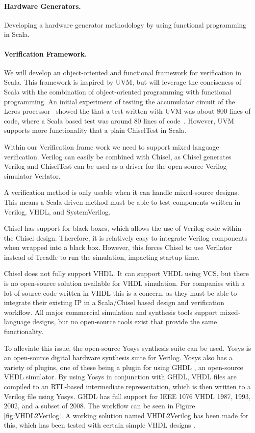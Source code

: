 \documentclass[fleqn,12pt]{article}
\begin{document}
\paragraph{Hardware Generators.}

Developing a hardware generator methodology by using functional programming in Scala.

\paragraph{Verification Framework.}

We will develop an object-oriented and functional framework for verification in Scala.
This framework is inspired by UVM, but will leverage the conciseness of Scala
with the combination of object-oriented programming with functional programming.
An initial experiment of testing the accumulator circuit of the Leros processor~\cite{leros:arcs2019}
showed the that a test written with UVM was about 800 lines of code, where a Scala based
test was around 80 lines of code~\cite{verify:chisel:2020}.
However, UVM supports more functionality that a plain ChiselTest in Scala.

Within our Verification frame work we need to support mixed language verification.
Verilog can easily be combined with Chisel, as Chisel generates Verilog and
ChiselTest can be used as a driver for the open-source Verilog simulator Verlator.

A verification method is only usable when it can handle mixed-source designs.
This means a Scala driven method must be able to test components written in Verilog,
VHDL, and SystemVerilog.

Chisel has support for black boxes, which allows the use of Verilog code within the Chisel design.
Therefore, it is relatively easy to integrate Verilog components when wrapped into a black box.
However, this forces Chisel to use Verilator instead of Treadle to run the simulation, impacting
startup time.

Chisel does not fully support VHDL. It can support VHDL using VCS, but there is no
open-source solution available for VHDL simulation. For companies with a lot of source code written in VHDL this is a concern, as they must be able to integrate their existing IP in a Scala/Chisel based design and verification workflow.
All major commercial simulation and synthesis tools support mixed-language designs, but no open-source tools exist that provide the same functionality.

To alleviate this issue, the open-source Yosys synthesis suite \cite{Yosys} can be used. Yosys is an open-source digital hardware synthesis suite for Verilog. Yosys also has a variety of plugins, one of these being a plugin for using GHDL \cite{ghdl}, an open-source VHDL simulator. By using Yosys in conjunction with GHDL, VHDL files are compiled to an RTL-based intermediate representation, which is then written to a Verilog file using Yosys. GHDL has full support for IEEE 1076 VHDL 1987, 1993, 2002, and a subset of 2008. The workflow can be seen in Figure \ref{fig:VHDL2Verilog}. A working solution named VHDL2Verilog has been made for this, which has been tested with certain simple VHDL designs \cite{vhdl2verilog}.
\end{document}

